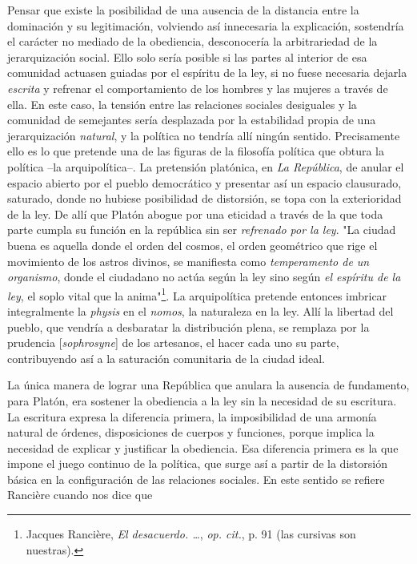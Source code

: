 \documentclass{book}
\begin{document}
Pensar que existe la posibilidad de una ausencia de la distancia entre
la dominación y su legitimación, volviendo así innecesaria la
explicación, sostendría el carácter no mediado de la obediencia,
desconocería la arbitrariedad de la jerarquización social. Ello solo
sería posible si las partes al interior de esa comunidad actuasen
guiadas por el espíritu de la ley, si no fuese necesaria dejarla
\emph{escrita} y refrenar el comportamiento de los hombres y las mujeres
a través de ella. En este caso, la tensión entre las relaciones sociales
desiguales y la comunidad de semejantes sería desplazada por la
estabilidad propia de una jerarquización \emph{natural}, y la política
no tendría allí ningún sentido. Precisamente ello es lo que pretende una
de las figuras de la filosofía política que obtura la política --la
arquipolítica--. La pretensión platónica, en \emph{La República}, de
anular el espacio abierto por el pueblo democrático y presentar así un
espacio clausurado, saturado, donde no hubiese posibilidad de
distorsión, se topa con la exterioridad de la ley. De allí que Platón
abogue por una eticidad a través de la que toda parte cumpla su función
en la república sin ser \emph{refrenado por la ley}. "La ciudad buena es
aquella donde el orden del cosmos, el orden geométrico que rige el
movimiento de los astros divinos, se manifiesta como \emph{temperamento
de un organismo}, donde el ciudadano no actúa según la ley sino según
\emph{el espíritu de la ley}, el soplo vital que la anima"\footnote{Jacques
  Rancière, \emph{El desacuerdo. \ldots{}}, \emph{op. cit.}, p. 91 (las
  cursivas son nuestras).}. La arquipolítica pretende entonces imbricar
integralmente la \emph{physis} en el \emph{nomos}, la naturaleza en la
ley. Allí la libertad del pueblo, que vendría a desbaratar la
distribución plena, se remplaza por la prudencia {[}\emph{sophrosyne}{]}
de los artesanos, el hacer cada uno su parte, contribuyendo así a la
saturación comunitaria de la ciudad ideal.

La única manera de lograr una República que anulara la ausencia de
fundamento, para Platón, era sostener la obediencia a la ley sin la
necesidad de su escritura. La escritura expresa la diferencia primera,
la imposibilidad de una armonía natural de órdenes, disposiciones de
cuerpos y funciones, porque implica la necesidad de explicar y
justificar la obediencia. Esa diferencia primera es la que impone el
juego continuo de la política, que surge así a partir de la distorsión
básica en la configuración de las relaciones sociales. En este sentido
se refiere Rancière cuando nos dice que
\end{document}
